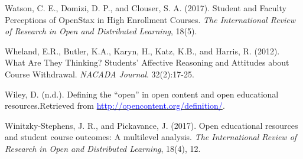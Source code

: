 \documentclass[11pt]{article}
\newcommand{\alink}[2]{\href{#1}{\textcolor{blue}{#2}}}
\begin{document}
\begin{thebibliography}{99}
   Watson, C. E., Domizi, D. P., and Clouser, S. A. (2017). Student and Faculty Perceptions of OpenStax in High Enrollment Courses. {\em The International Review of Research in Open and Distributed Learning}, 18(5). %

   Wheland, E.R., Butler, K.A., Karyn, H., Katz, K.B., and Harris, R. (2012). What Are They Thinking? Students' Affective Reasoning and Attitudes about Course Withdrawal. {\em NACADA Journal}. 32(2):17-25.

   Wiley, D. (n.d.). Defining the ``open'' in open content and open educational resources.\newline Retrieved from \alink{http://opencontent.org/definition/}{http://opencontent.org/definition/}.

   Winitzky-Stephens, J. R., and Pickavance, J. (2017). Open educational resources and student course outcomes: A multilevel analysis. {\em The International Review of Research in Open and Distributed Learning}, 18(4), 12.

\end{thebibliography}
\end{document}
